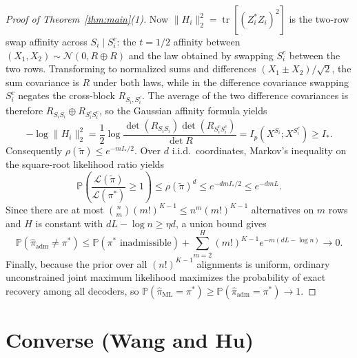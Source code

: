 \documentclass[11pt]{article}
\theoremstyle{plain}
\theoremstyle{definition}
\theoremstyle{remark}
\DeclareMathOperator{\tr}{tr}
\begin{document}
\begin{proof}[Proof of Theorem~\ref{thm:main}\textup{(1)}]
Now $\|H_i\|_2^2 = \tr[(Z_i^* Z_i)^2]$ is the two-row swap affinity across $S_i \mid S_i^c$: the $t = 1/2$ affinity between $(X_1, X_2) \sim \mathcal{N}(0, R \oplus R)$ and the law obtained by swapping $S_i^c$ between the two rows.
Transforming to normalized sums and differences $(X_1 \pm X_2)/\sqrt{2}$, the sum covariance is $R$ under both laws, while in the difference covariance swapping $S_i^c$ negates the cross-block $R_{S_i, S_i^c}$.
The average of the two difference covariances is therefore $R_{S_i S_i} \oplus R_{S_i^c S_i^c}$, so the Gaussian affinity formula yields
\begin{equation}\label{eq:swap-id}
-\log \|H_i\|_2^2
= \frac{1}{2}\log \frac{\det(R_{S_i S_i})\det(R_{S_i^c S_i^c})}{\det R}
= I_p(X^{S_i}; X^{S_i^c}) \ge I_*.
\end{equation}
Consequently $\rho(\tilde{\pi}) \le e^{-m I_*/2}$.
Over $d$ i.i.d.\ coordinates, Markov's inequality on the square-root likelihood ratio yields
\[
\mathbb{P}\!\left(\frac{\mathcal{L}(\tilde{\pi})}{\mathcal{L}(\pi^*)} \ge 1\right)
\le \rho(\tilde{\pi})^d
\le e^{-dm I_*/2}
\le e^{-dm L}.
\]
Since there are at most $\binom{n}{m}(m!)^{K-1} \le n^m (m!)^{K-1}$ alternatives on $m$ rows and $H$ is constant with $dL - \log n \ge \eta d$, a union bound gives
\[
\mathbb{P}(\widehat{\pi}_{\mathrm{adm}} \neq \pi^*)
\le \mathbb{P}(\pi^* \text{ inadmissible})
+ \sum_{m=2}^H (m!)^{K-1} e^{-m(dL - \log n)}
\longrightarrow 0.
\]
Finally, because the prior over all $(n!)^{K-1}$ alignments is uniform, ordinary unconstrained joint maximum likelihood maximizes the probability of exact recovery among all decoders, so $\mathbb{P}(\widehat{\pi}_{\mathrm{ML}} = \pi^*) \ge \mathbb{P}(\widehat{\pi}_{\mathrm{adm}} = \pi^*) \to 1$.
\end{proof}

\section{Converse (Wang and Hu)}
\end{document}
